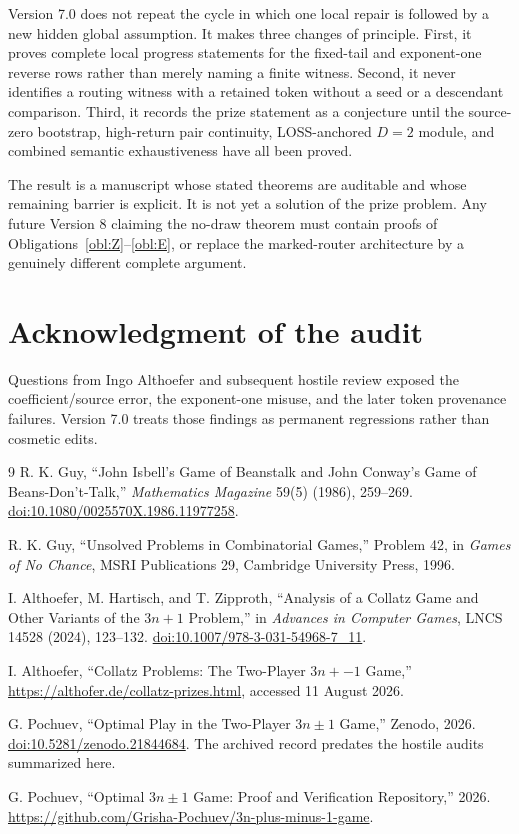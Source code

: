 \documentclass[11pt,a4paper]{article}
\theoremstyle{definition}
\theoremstyle{remark}
\begin{document}
Version 7.0 does not repeat the cycle in which one local repair is followed
by a new hidden global assumption.  It makes three changes of principle.
First, it proves complete local progress statements for the fixed-tail and
exponent-one reverse rows rather than merely naming a finite witness.
Second, it never identifies a routing witness with a retained token without
a seed or a descendant comparison.  Third, it records the prize statement
as a conjecture until the source-zero bootstrap, high-return pair continuity,
LOSS-anchored $D=2$ module, and combined semantic exhaustiveness have all
been proved.

The result is a manuscript whose stated theorems are auditable and whose
remaining barrier is explicit.  It is not yet a solution of the prize
problem.  Any future Version 8 claiming the no-draw theorem must contain
proofs of Obligations~\ref{obl:Z}--\ref{obl:E}, or replace the marked-router
architecture by a genuinely different complete argument.

\section*{Acknowledgment of the audit}
Questions from Ingo Althoefer and subsequent hostile review exposed the
coefficient/source error, the exponent-one misuse, and the later token
provenance failures.  Version 7.0 treats those findings as permanent
regressions rather than cosmetic edits.

\begingroup
\raggedright
\begin{thebibliography}{9}
R. K. Guy,
``John Isbell's Game of Beanstalk and John Conway's Game of Beans-Don't-Talk,''
\emph{Mathematics Magazine} 59(5) (1986), 259--269.
\href{https://doi.org/10.1080/0025570X.1986.11977258}{doi:10.1080/0025570X.1986.11977258}.

R. K. Guy,
``Unsolved Problems in Combinatorial Games,'' Problem 42,
in \emph{Games of No Chance}, MSRI Publications 29,
Cambridge University Press, 1996.

I. Althoefer, M. Hartisch, and T. Zipproth,
``Analysis of a Collatz Game and Other Variants of the $3n+1$ Problem,''
in \emph{Advances in Computer Games}, LNCS 14528 (2024), 123--132.
\href{https://doi.org/10.1007/978-3-031-54968-7_11}{doi:10.1007/978-3-031-54968-7\_11}.

I. Althoefer,
``Collatz Problems: The Two-Player $3n{+}{-}1$ Game,''
\url{https://althofer.de/collatz-prizes.html}, accessed 11 August 2026.

G. Pochuev,
``Optimal Play in the Two-Player $3n\pm1$ Game,''
Zenodo, 2026.
\href{https://doi.org/10.5281/zenodo.21844684}{doi:10.5281/zenodo.21844684}.
The archived record predates the hostile audits summarized here.

G. Pochuev,
``Optimal $3n\pm1$ Game: Proof and Verification Repository,'' 2026.
\url{https://github.com/Grisha-Pochuev/3n-plus-minus-1-game}.
\end{thebibliography}
\endgroup
\end{document}
